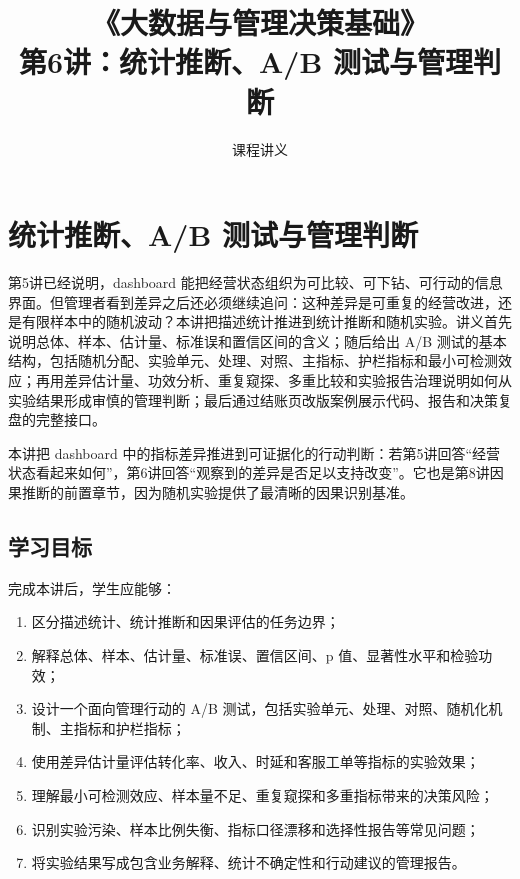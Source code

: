 \documentclass[UTF8,fontset=fandol,openany,zihao=-4]{ctexbook}
\title{《大数据与管理决策基础》\\[0.5em]\large 第6讲：统计推断、A/B 测试与管理判断}
\author{课程讲义}
\date{}
\begin{document}
\maketitle
\tableofcontents

\setcounter{chapter}{5}
\chapter{统计推断、A/B 测试与管理判断}
\label{ch:week06-ab-testing}

\begin{chapterbox}
第5讲已经说明，dashboard 能把经营状态组织为可比较、可下钻、可行动的信息界面。但管理者看到差异之后还必须继续追问：这种差异是可重复的经营改进，还是有限样本中的随机波动？本讲把描述统计推进到统计推断和随机实验。讲义首先说明总体、样本、估计量、标准误和置信区间的含义；随后给出 A/B 测试的基本结构，包括随机分配、实验单元、处理、对照、主指标、护栏指标和最小可检测效应；再用差异估计量、功效分析、重复窥探、多重比较和实验报告治理说明如何从实验结果形成审慎的管理判断；最后通过结账页改版案例展示代码、报告和决策复盘的完整接口。
\end{chapterbox}

\begin{modernbox}[课程接口]
本讲把 dashboard 中的指标差异推进到可证据化的行动判断：若第5讲回答“经营状态看起来如何”，第6讲回答“观察到的差异是否足以支持改变”。它也是第8讲因果推断的前置章节，因为随机实验提供了最清晰的因果识别基准。
\end{modernbox}

\section{学习目标}

完成本讲后，学生应能够：
\begin{enumerate}
  \item 区分描述统计、统计推断和因果评估的任务边界；
  \item 解释总体、样本、估计量、标准误、置信区间、p 值、显著性水平和检验功效；
  \item 设计一个面向管理行动的 A/B 测试，包括实验单元、处理、对照、随机化机制、主指标和护栏指标；
  \item 使用差异估计量评估转化率、收入、时延和客服工单等指标的实验效果；
  \item 理解最小可检测效应、样本量不足、重复窥探和多重指标带来的决策风险；
  \item 识别实验污染、样本比例失衡、指标口径漂移和选择性报告等常见问题；
  \item 将实验结果写成包含业务解释、统计不确定性和行动建议的管理报告。
\end{enumerate}
\end{document}
